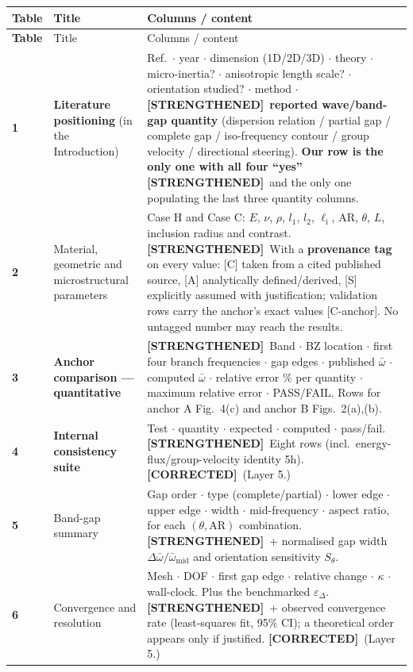 \documentclass[11pt,a4paper]{article}
\newcommand{\STR}{{\color{strcol}\textbf{[STRENGTHENED]}}}
\newcommand{\COR}{{\color{corcol}\textbf{[CORRECTED]}}}
\begin{document}
\begin{xltabular}{\textwidth}{@{}>{\bfseries}p{1.05cm} L{4.0cm} Y@{}}
\toprule
Table & Title & Columns / content \\
\midrule
\endfirsthead
\toprule
Table & Title & Columns / content \\
\midrule
{} & \textbf{Literature positioning} (in the Introduction) & Ref.\ $\cdot$ year $\cdot$ dimension (1D/2D/3D) $\cdot$ theory $\cdot$ micro-inertia? $\cdot$ anisotropic length scale? $\cdot$ orientation studied? $\cdot$ method $\cdot$ \STR\ \textbf{reported wave/band-gap quantity} (dispersion relation / partial gap / complete gap / iso-frequency contour / group velocity / directional steering). \textbf{Our row is the only one with all four ``yes''} \STR\ and the only one populating the last three quantity columns. \\
2 & Material, geometric and microstructural parameters & Case H and Case C: $E$, $\nu$, $\rho$, $l_1$, $l_2$, $\ell_{\mathrm i}$, $\mathrm{AR}$, $\theta$, $L$, inclusion radius and contrast. \STR\ With a \textbf{provenance tag} on every value: [C] taken from a cited published source, [A] analytically defined/derived, [S] explicitly assumed with justification; validation rows carry the anchor's exact values [C-anchor]. No untagged number may reach the results. \\
3 & \textbf{Anchor comparison --- quantitative} & \STR\ Band $\cdot$ BZ location $\cdot$ first four branch frequencies $\cdot$ gap edges $\cdot$ published $\bar\omega$ $\cdot$ computed $\bar\omega$ $\cdot$ relative error \% per quantity $\cdot$ maximum relative error $\cdot$ PASS/FAIL. Rows for anchor A Fig.~4(c) and anchor B Figs.~2(a),(b). \\
4 & \textbf{Internal consistency suite} & Test $\cdot$ quantity $\cdot$ expected $\cdot$ computed $\cdot$ pass/fail. \STR\ Eight rows (incl.\ energy-flux/group-velocity identity 5h). \COR\ (Layer 5.) \\
5 & Band-gap summary & Gap order $\cdot$ type (complete/partial) $\cdot$ lower edge $\cdot$ upper edge $\cdot$ width $\cdot$ mid-frequency $\cdot$ aspect ratio, for each $(\theta,\mathrm{AR})$ combination. \STR\ + normalised gap width $\Delta\bar\omega/\bar\omega_{\mathrm{mid}}$ and orientation sensitivity $S_\theta$. \\
6 & Convergence and resolution & Mesh $\cdot$ DOF $\cdot$ first gap edge $\cdot$ relative change $\cdot$ $\kappa$ $\cdot$ wall-clock. Plus the benchmarked $\varepsilon_\Delta$. \STR\ + observed convergence rate (least-squares fit, 95\% CI); a theoretical order appears only if justified. \COR\ (Layer 5.) \\
\bottomrule
\end{xltabular}
\end{document}
